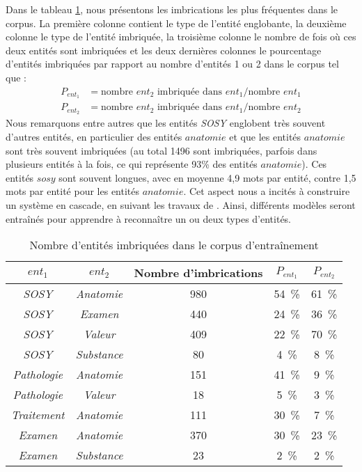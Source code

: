 Dans le tableau \ref{tab:tal:imb}, nous présentons les imbrications les plus fréquentes dans le corpus.
La première colonne contient le type de l'entité englobante, la deuxième colonne le type de l'entité imbriquée, la troisième colonne le nombre de fois où ces deux entités sont imbriquées et les deux dernières colonnes le pourcentage d'entités imbriquées par rapport au nombre d'entités 1 ou 2 dans le corpus tel que :
\begin{align*}
    P_{ent_1} & = \text{nombre } ent_2 \text{ imbriquée dans } ent_1 / \text{nombre } ent_1 \\
    P_{ent_2} & = \text{nombre } ent_2 \text{ imbriquée dans } ent_1 / \text{nombre } ent_2
\end{align*}
Nous remarquons entre autres que les entités \emph{SOSY} englobent très souvent d'autres entités, en particulier des entités $anatomie$ et que les entités $anatomie$ sont très souvent imbriquées (au total 1496 sont imbriquées, parfois dans plusieurs entités à la fois, ce qui représente 93\% des entités $anatomie$). Ces entités $sosy$ sont souvent longues, avec en moyenne 4,9 mots par entité, contre 1,5 mots par entité pour les entités $anatomie$.
Cet aspect nous a incités à construire un système en cascade, en suivant les travaux de \cite{alexRecognisingNestedNamed2007}. Ainsi, différents modèles seront entraînés pour apprendre à reconnaître un ou deux types d'entités.

\begin{table}[htb]
    \centering
    \begin{tabular}{c|c|c|c|c}
        $ent_1$           & $ent_2$          & Nombre d'imbrications & $P_{ent_1}$       & $P_{ent_2}$       \\
        \hline
        \hline
        \emph{SOSY}       & \emph{Anatomie}  & \num{980}             & \SI{54}{\percent} & \SI{61}{\percent} \\
        \emph{SOSY}       & \emph{Examen}    & \num{440}             & \SI{24}{\percent} & \SI{36}{\percent} \\
        \emph{SOSY}       & \emph{Valeur}    & \num{409}             & \SI{22}{\percent} & \SI{70}{\percent} \\
        \emph{SOSY}       & \emph{Substance} & \num{ 80}             & \SI{4}{\percent}  & \SI{ 8}{\percent} \\
        \emph{Pathologie} & \emph{Anatomie}  & \num{151}             & \SI{41}{\percent} & \SI{ 9}{\percent} \\
        \emph{Pathologie} & \emph{Valeur}    & \num{ 18}             & \SI{5}{\percent}  & \SI{ 3}{\percent} \\
        \emph{Traitement} & \emph{Anatomie}  & \num{111}             & \SI{30}{\percent} & \SI{ 7}{\percent} \\
        \emph{Examen}     & \emph{Anatomie}  & \num{370}             & \SI{30}{\percent} & \SI{23}{\percent} \\
        \emph{Examen}     & \emph{Substance} & \num{ 23}             & \SI{2}{\percent}  & \SI{ 2}{\percent}
    \end{tabular}
    \caption{Nombre d'entités imbriquées dans le corpus d'entraînement}
    \label{tab:tal:imb}
\end{table}


